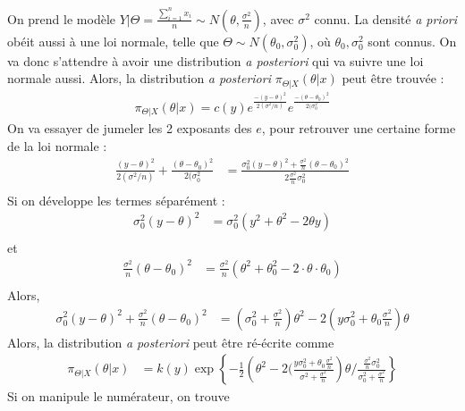 \documentclass[12pt, french]{report}
\begin{document}
\begin{exemple}
On prend le modèle $Y|\Theta = \frac{\sum_{i=1}^{n} x_i}{n} \sim N \left(\theta, \frac{\sigma^2}{n} \right)$, avec $\sigma^2$ connu. La densité \emph{a priori} obéit aussi à une loi normale, telle que $\Theta \sim N(\theta_0, \sigma^2_0)$, où $\theta_0, \sigma^2_0$ sont connus. On va donc s'attendre à avoir une distribution \emph{a posteriori} qui va suivre une loi normale aussi. Alors, la distribution \emph{a posteriori} $\pi_{\Theta | X}(\theta | x)$ peut être trouvée : 
\begin{align*}
\pi_{\Theta | X}(\theta | x) = c(y) e^{\frac{-(y-\theta)^2}{2 (\sigma^2/n)}} e^{\frac{-(\theta - \theta_0)^2}{2(\sigma_0^2}}
\end{align*}
On va essayer de jumeler les 2 exposants des $e$, pour retrouver une certaine forme de la loi normale : 
\begin{align*}
\frac{(y-\theta)^2}{2 (\sigma^2/n)} + \frac{(\theta - \theta_0)^2}{2(\sigma_0^2}  & = \frac{\sigma_0^2 (y-\theta)^2 + \frac{\sigma^2}{n} (\theta - \theta_0)^2}{2 \frac{\sigma^2}{n} \sigma_0^2} \\
\end{align*}
Si on développe les termes séparément : 
\begin{align*}
\sigma_0^2 (y - \theta)^2 & = \sigma_0^2 (y^2 + \theta^2 - 2 \theta y) \\
\end{align*}
et
\begin{align*}
\frac{\sigma^2}{n} (\theta - \theta_0)^2 & = \frac{\sigma^2}{n} (\theta^2 + \theta_0^2 - 2 \cdot \theta \cdot \theta_0) \\
\end{align*}
Alors,
\begin{align*}
\sigma_0^2 (y - \theta)^2 + \frac{\sigma^2}{n} (\theta - \theta_0)^2 & = \left( \sigma_0^2 + \frac{\sigma^2}{n} \right) \theta^2 - 2 \left( y \sigma_0^2  + \theta_0 \frac{\sigma^2}{n}  \right) \theta
\end{align*}
Alors, la distribution \emph{a posteriori} peut être ré-écrite comme
\begin{align*}
\pi_{\Theta | X}(\theta | x) & = k(y) \exp \left \{ - \frac{1}{2} \left( \theta^2 - 2 ( \frac{y \sigma_0^2 + \theta_0 \frac{\sigma^2}{n}}{\sigma^2 + \frac{\sigma^2}{n}} \right) \theta /  \frac{\frac{\sigma^2}{n} \sigma_0^2}{\sigma_0^2 + \frac{\sigma^2}{n}}       \right \}
\end{align*}
Si on manipule le numérateur, on trouve
\begin{align*}

\end{align*}
\end{exemple}
\end{document}
